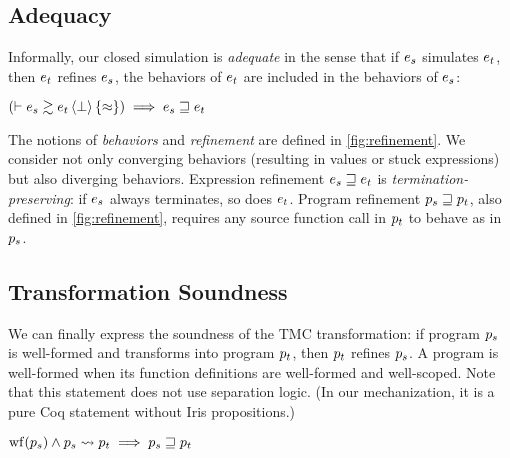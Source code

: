 \subsection{Adequacy}

Informally, our closed simulation is \emph{adequate} in the sense that if $\datalangExpr_s$ simulates $\datalangExpr_t$, then $\datalangExpr_t$ refines $\datalangExpr_s$, \ie the behaviors of $\datalangExpr_t$ are included in the behaviors of $\datalangExpr_s$:

\begin{theorem} \label{thm:adequacy}
    $
        \left( \vdash \iSimv[\bot]{\iSimilar}{\datalangExpr_s}{\datalangExpr_t} \right) \implies
        \datalangExpr_s \refined \datalangExpr_t
    $
\end{theorem}

The notions of \emph{behaviors} and \emph{refinement} are defined in \cref{fig:refinement}.
We consider not only converging behaviors (resulting in values or stuck expressions) but also diverging behaviors.
Expression refinement $\datalangExpr_s \refined \datalangExpr_t$ is \emph{termination-preserving}: if $\datalangExpr_s$ always terminates, so does $\datalangExpr_t$.
Program refinement $\datalangProg_s \refined \datalangProg_t$, also defined in \cref{fig:refinement}, requires any source function call in $\datalangProg_t$ to behave as in $\datalangProg_s$.

\subsection{Transformation Soundness}

We can finally express the soundness of the TMC transformation: if program $\datalangProg_s$ is well-formed and transforms into program $\datalangProg_t$, then $\datalangProg_t$ refines $\datalangProg_s$.
A program is well-formed when its function definitions are well-formed and well-scoped.
%
Note that this statement does not use separation logic. (In our mechanization, it is a pure Coq statement without Iris propositions.)

\begin{theorem} \label{thm:soundness}
    $
        \wf{\datalangProg_s} \wedge \datalangProg_s \tmc \datalangProg_t \implies
        \datalangProg_s \refined \datalangProg_t
    $
\end{theorem}


